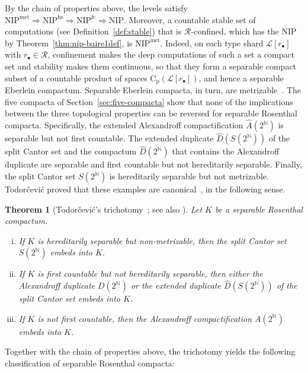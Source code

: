 \documentclass[psamsfonts]{amsart}
\newtheorem{thm}{Theorem}[section]
\theoremstyle{definition}
\theoremstyle{remark}
\newcommand{\Cp}{\mathrm{C}_{\mathrm{p}}}
\newcommand{\NIP}{\text{NIP}}
\numberwithin{equation}{section}
\begin{document}
By the chain of properties above, the levels satisfy $\NIP^{\mathrm{met}} \Rightarrow \NIP^{\mathrm{hs}}\Rightarrow \NIP^{\mathrm{fc}}\Rightarrow \NIP$.
Moreover, a countable stable set of computations (see Definition~\ref{def:stable}) that is $\mathscr{R}$-confined, which has the NIP by Theorem~\ref{thm:nip-baire1def}, is $\NIP^{\mathrm{met}}$.
Indeed, on each type shard $\mathcal{L}[r_\bullet]$ with $r_\bullet\in\mathscr{R}$, confinement makes the deep computations of such a set a compact set and stability makes them continuous, so that they form a separable compact subset of a countable product of spaces $\Cp(\mathcal{L}[r_\bullet])$, and hence a separable Eberlein compactum.
Separable Eberlein compacta, in turn, are metrizable~\cite{Arkhangelskii:1992}.
The five compacta of Section~\ref{sec:five-compacta} show that none of the implications between the three topological properties can be reversed for separable Rosenthal compacta.
Specifically, the extended Alexandroff compactification $\hat{A}(2^{\mathbb{N}})$ is separable but not first countable.
The extended duplicate $\hat{D}(S(2^{\mathbb{N}}))$ of the split Cantor set and the compactum $\hat{D}(2^{\mathbb{N}})$ that contains the Alexandroff duplicate are separable and first countable but not hereditarily separable.
Finally, the split Cantor set $S(2^{\mathbb{N}})$ is hereditarily separable but not metrizable.
Todorčević proved that these examples are canonical~\cite{Todorcevic_1999_CompactSubsetsBaire}, in the following sense.

\begin{thm}[Todorčević’s trichotomy~\cite{Todorcevic_1999_CompactSubsetsBaire}; see also {\cite[Theorem~3]{argyros2008rosenthal}}]\label{thm:Todorcevic-trichotomy}
  Let $K$ be a separable Rosenthal compactum.
  \begin{enumerate}[(i)]
  \item
    If $K$ is hereditarily separable but non-metrizable, then the split Cantor set $S(2^\mathbb{N})$ embeds into $K$.
  \item
    If $K$ is first countable but not hereditarily separable, then either the Alexandroff duplicate $D(2^\mathbb{N})$ or the extended duplicate $\hat{D}(S(2^\mathbb{N}))$ of the split Cantor set embeds into $K$.
  \item
    If $K$ is not first countable, then the Alexandroff compactification $A(2^\mathbb{N})$ embeds into $K$.
  \end{enumerate}
\end{thm}

Together with the chain of properties above, the trichotomy yields the following classification of separable Rosenthal compacta:
\end{document}
